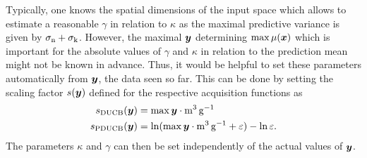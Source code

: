 Typically, one knows the spatial dimensions of the input space which allows to 
estimate a reasonable $\gamma$ in relation to $\kappa$ as the maximal predictive 
variance is given by $\sigma_{\mathrm{n}} + \sigma_{\mathrm{k}}$.  However, the maximal $\bm{y}$ determining $\max \mu(\bm{x})$ which is important for the absolute values of 
$\gamma$ and $\kappa$ in relation to the prediction mean might not be known in 
advance.  Thus, it would be helpful to set these parameters automatically from 
$\bm{y}$, the data seen so far.  This can be done by setting the scaling factor 
$s(\bm{y})$ defined for the respective acquisition functions as
\begin{align}
    s_{\mathrm{DUCB}}(\bm{y}) &= \max \bm{y} \cdot \si{\meter\cubed\per\gram} 
    \label{eqn:scale-ducb}\\
    s_{\mathrm{PDUCB}}(\bm{y}) &= \ln(\max \bm{y} \cdot \si{\meter\cubed\per\gram} 
    + \varepsilon) - \ln \varepsilon \text{.} \label{eqn:scale-pducb}
\end{align}
The parameters $\kappa$ and $\gamma$ can then be set independently of the actual 
values of $\bm{y}$.

